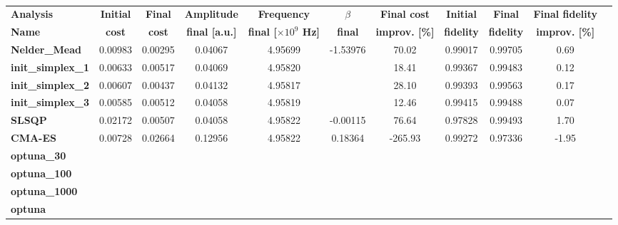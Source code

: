 \begin{table}
    \centering
    \begin{tabular}{lcccccccccc}
        \toprule
        \textbf{Analysis} & \textbf{Initial} & \textbf{Final} & \textbf{Amplitude} & \textbf{Frequency} & \textbf{$\beta$} & \textbf{Final cost} & \textbf{Initial} & \textbf{Final} & \textbf{Final fidelity} \\
        \textbf{Name} & \textbf{cost} & \textbf{cost} & \textbf{final [a.u.]} & \textbf{final [$\times10^9$ Hz]} & \textbf{final} & \textbf{improv. [\%]} & \textbf{fidelity} & \textbf{fidelity} & \textbf{improv. [\%]} \\
        \midrule
        \textbf{Nelder\_Mead} & 0.00983 & 0.00295 & 0.04067 & 4.95699 & -1.53976 & 70.02 & 0.99017 & 0.99705 & 0.69 \\
        \textbf{init\_simplex\_1} & 0.00633 & 0.00517 & 0.04069 & 4.95820 &  & 18.41 & 0.99367 & 0.99483 & 0.12 \\
        \textbf{init\_simplex\_2} & 0.00607 & 0.00437 & 0.04132 & 4.95817 &  & 28.10 & 0.99393 & 0.99563 & 0.17 \\
        \textbf{init\_simplex\_3} & 0.00585 & 0.00512 & 0.04058 & 4.95819 &  & 12.46 & 0.99415 & 0.99488 & 0.07 \\
        \textbf{SLSQP} & 0.02172 & 0.00507 & 0.04058 & 4.95822 & -0.00115 & 76.64 & 0.97828 & 0.99493 & 1.70 \\
        \textbf{CMA-ES} & 0.00728 & 0.02664 & 0.12956 & 4.95822 & 0.18364 & -265.93 & 0.99272 & 0.97336 & -1.95 \\
        \textbf{optuna\_30} & & & & & & & & & \\
        \textbf{optuna\_100} & & & & & & & & & \\
        \textbf{optuna\_1000} & & & & & & & & & \\
        \textbf{optuna} & & & & & & & & & \\
        \bottomrule
    \end{tabular}
    \caption{}
    \label{tab:final_values}
\end{table}

